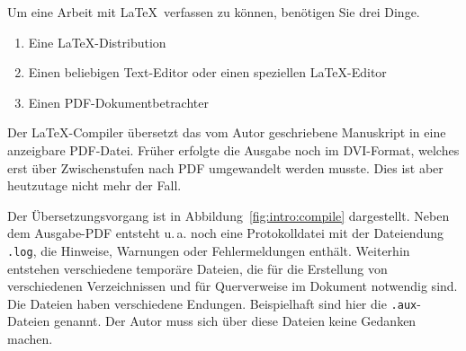 Um eine Arbeit mit \LaTeX\ verfassen zu können, benötigen Sie drei Dinge.

\begin{enumerate}
\item Eine \LaTeX-Distribution

\item Einen beliebigen Text-Editor oder einen speziellen \LaTeX-Editor

\item Einen PDF-Dokumentbetrachter
\end{enumerate}


Der \LaTeX-Compiler übersetzt das vom Autor geschriebene Manuskript in eine
anzeigbare PDF-Datei. Früher erfolgte die Ausgabe noch im DVI-Format, welches
erst über Zwischenstufen nach PDF umgewandelt werden musste. Dies ist aber
heutzutage nicht mehr der Fall.

Der Übersetzungsvorgang ist in Abbildung~\ref{fig:intro:compile} dargestellt.
Neben dem Ausgabe-PDF entsteht u.\,a. noch eine Protokolldatei mit der
Dateiendung \texttt{.log}, die Hinweise, Warnungen oder Fehlermeldungen
enthält. Weiterhin entstehen verschiedene temporäre Dateien, die für die
Erstellung von verschiedenen Verzeichnissen und für Querverweise im Dokument
notwendig sind. Die Dateien haben verschiedene Endungen. Beispielhaft sind
hier die \texttt{.aux}-Dateien genannt. Der Autor muss sich über diese Dateien
keine Gedanken machen.


